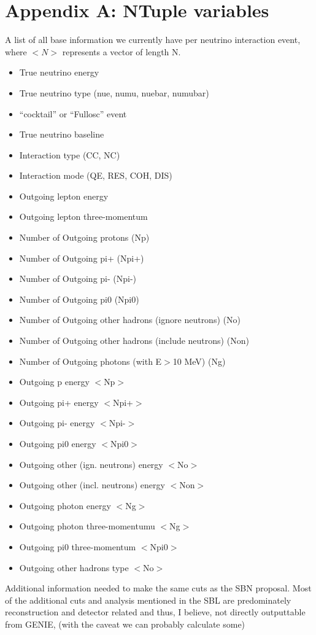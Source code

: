 \documentclass[12pt, a4paper]{article}
\begin{document}
\section{Appendix A: NTuple variables}
A list of all base information we currently have per neutrino interaction event, where $<N>$ represents a vector of length N.
\begin{itemize}
	\item True neutrino energy
	\item True neutrino type (nue, numu, nuebar, numubar)
	\item “cocktail” or “Fullosc” event
	\item True neutrino baseline
	\item Interaction type (CC, NC)
	\item Interaction mode (QE, RES, COH, DIS)
	\item Outgoing lepton energy
	\item Outgoing lepton three-momentum
	\item Number of Outgoing protons (Np)
	\item Number of Outgoing pi+ (Npi+)
	\item Number of Outgoing pi- (Npi-)
	\item Number of Outgoing pi0 (Npi0)
	\item Number of Outgoing other hadrons (ignore neutrons) (No)
	\item Number of Outgoing other hadrons (include neutrons) (Non)
	\item Number of Outgoing photons (with E$>$10 MeV) (Ng)
	\item Outgoing p energy $<$Np$>$
	\item Outgoing pi+ energy $<$Npi+$>$
	\item Outgoing pi- energy $<$Npi-$>$
	\item Outgoing pi0 energy $<$Npi0$>$
	\item Outgoing other (ign. neutrons) energy $<$No$>$
	\item Outgoing other (incl. neutrons) energy $<$Non$>$
	\item Outgoing photon energy $<$Ng$>$
	\item Outgoing photon three-momentumu $<$Ng$>$
	\item Outgoing pi0 three-momentum $<$Npi0$>$
	\item Outgoing other hadrons type $<$No$>$
\end{itemize}
Additional information needed to make the same cuts as the SBN proposal. Most of the additional cuts and analysis mentioned in the SBL are predominately reconstruction and detector related and thus, I believe, not directly outputtable from GENIE, (with the caveat we can probably calculate some) 
\end{document}
